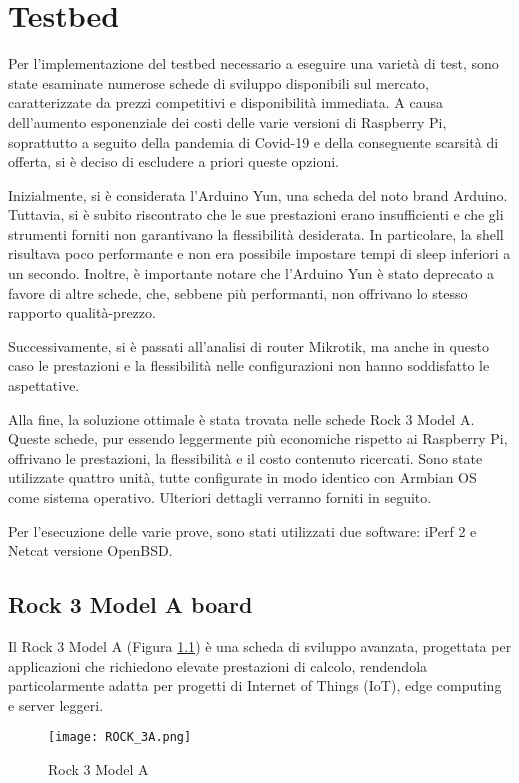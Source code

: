 \chapter{Testbed}

Per l'implementazione del testbed necessario a eseguire una varietà di test, sono state esaminate numerose schede di sviluppo disponibili sul mercato, caratterizzate da prezzi competitivi e disponibilità immediata. A causa dell'aumento esponenziale dei costi delle varie versioni di Raspberry Pi, soprattutto a seguito della pandemia di Covid-19 e della conseguente scarsità di offerta, si è deciso di escludere a priori queste opzioni.

Inizialmente, si è considerata l'Arduino Yun, una scheda del noto brand Arduino. Tuttavia, si è subito riscontrato che le sue prestazioni erano insufficienti e che gli strumenti forniti non garantivano la flessibilità desiderata. In particolare, la shell risultava poco performante e non era possibile impostare tempi di sleep inferiori a un secondo. Inoltre, è importante notare che l'Arduino Yun è stato deprecato a favore di altre schede, che, sebbene più performanti, non offrivano lo stesso rapporto qualità-prezzo.

Successivamente, si è passati all'analisi di router Mikrotik, ma anche in questo caso le prestazioni e la flessibilità nelle configurazioni non hanno soddisfatto le aspettative.

Alla fine, la soluzione ottimale è stata trovata nelle schede Rock 3 Model A. Queste schede, pur essendo leggermente più economiche rispetto ai Raspberry Pi, offrivano le prestazioni, la flessibilità e il costo contenuto ricercati. Sono state utilizzate quattro unità, tutte configurate in modo identico con Armbian OS come sistema operativo. Ulteriori dettagli verranno forniti in seguito.

Per l'esecuzione delle varie prove, sono stati utilizzati due software: iPerf 2 e Netcat versione OpenBSD.

\section{Rock 3 Model A board}

Il Rock 3 Model A (Figura \ref{fig:rock}) è una scheda di sviluppo avanzata, progettata per applicazioni che richiedono elevate prestazioni di calcolo, rendendola particolarmente adatta per progetti di Internet of Things (IoT), edge computing e server leggeri. 

\begin{figure}[h!]
    \centering
    \texttt{[image: ROCK\_3A.png]}
    \caption{Rock 3 Model A}
    \label{fig:rock}
\end{figure}

